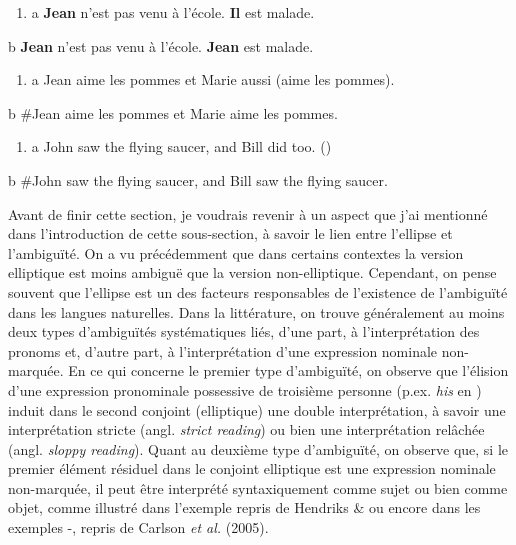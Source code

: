 \begin{enumerate}
\item \label{bkm:Ref286951586}a  \textbf{Jean} n'est pas venu à l'école. \textbf{Il} est malade.  


\end{enumerate}
b  \textbf{Jean} n'est pas venu à l'école. \textbf{Jean} est malade. 


\begin{enumerate}
\item \label{bkm:Ref286951914}a  Jean aime les pommes et Marie aussi (aime les pommes).  


\end{enumerate}
b  \#Jean aime les pommes et Marie aime les pommes. 


\begin{enumerate}
\item \label{bkm:Ref286951937}a  John saw the flying saucer, and Bill did too. (\citet{Dalrymple2005})


\end{enumerate}
  b  \#John saw the flying saucer, and Bill saw the flying saucer. 

Avant de finir cette section, je voudrais revenir à un aspect que j'ai mentionné dans l'introduction de cette sous-section, à savoir le lien entre l'ellipse et l'ambiguïté. On a vu précédemment que dans certains contextes la version elliptique est moins ambiguë que la version non-elliptique. Cependant, on pense souvent que l'ellipse est un des facteurs responsables de l'existence de l'ambiguïté dans les langues naturelles. Dans la littérature, on trouve généralement au moins deux types d'ambiguïtés systématiques liés, d'une part, à l'interprétation des pronoms et, d'autre part, à l'interprétation d'une expression nominale non-marquée. En ce qui concerne le premier type d'ambiguïté, on observe que l'élision d'une expression pronominale possessive de troisième personne (p.ex.\textit{ his} en ) induit dans le second conjoint (elliptique) une double interprétation, à savoir une interprétation stricte (angl. \textit{strict reading}) ou bien une interprétation relâchée (angl. \textit{sloppy reading}). Quant au deuxième type d'ambiguïté, on observe que, si le premier élément résiduel dans le conjoint elliptique est une expression nominale non-marquée, il peut être interprété syntaxiquement comme sujet ou bien comme objet, comme illustré dans l'exemple  repris de Hendriks \& \citet{Spenader2005} ou encore dans les exemples -, repris de Carlson \textit{et al.} (2005). 



